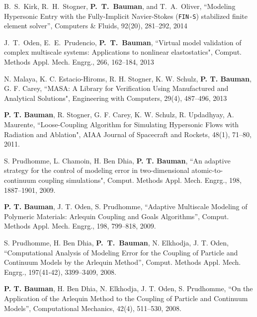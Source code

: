 %
B.~S.~Kirk, R.~H.~Stogner, \textbf{P.~T.~Bauman}, and T.~A.~Oliver,
``Modeling Hypersonic Entry with the Fully-Implicit Navier-Stokes (\texttt{FIN-S})
stabilized finite element solver'', Computers \& Fluids, 92(20), 281--292, 2014

\blankline

J.~T.~Oden, E.~E.~Prudencio, \textbf{P.~T.~Bauman},
``Virtual model validation of complex multiscale systems:
Applications to nonlinear elastostatics",
Comput. Methods Appl. Mech. Engrg., 266, 162--184, 2013

\blankline

N. Malaya, K. C. Estacio-Hiroms, R. H. Stogner, K. W. Schulz, \textbf{P. T. Bauman},
G. F. Carey,
``MASA: A Library for Verification Using Manufactured and Analytical Solutions",
Engineering with Computers, 29(4), 487--496, 2013

\blankline

\textbf{P. T. Bauman}, R. Stogner, G. F. Carey, K. W. Schulz, R. Updadhyay, A. Maurente, ``Loose-Coupling Algorithm for Simulating 
Hypersonic Flows with Radiation and Ablation", AIAA Journal of Spacecraft and Rockets, 48(1), 71--80, 2011.

\blankline

S. Prudhomme, L. Chamoin, H. Ben Dhia, \textbf{P. T. Bauman}, ``An adaptive strategy for the control of modeling error in two-dimensional atomic-to-continuum coupling simulations", Comput. Methods Appl. Mech. Engrg., 198, 1887--1901, 2009.

\blankline

\textbf{P. T. Bauman}, J. T. Oden, S. Prudhomme, ``Adaptive Multiscale Modeling of Polymeric Materials: Arlequin Coupling and Goals Algorithms'', Comput. Methods Appl. Mech. Engrg., 198, 799--818, 2009.
 
\blankline

S. Prudhomme, H. Ben Dhia, \textbf{P.~T.~Bauman}, N. Elkhodja, J. T. Oden, ``Computational Analysis of Modeling Error for the Coupling of Particle and Continuum Models by the Arlequin Method'', Comput. Methods Appl. Mech. Engrg., 197(41-42), 3399--3409, 2008.

\blankline

\textbf{P. T. Bauman}, H. Ben Dhia, N. Elkhodja, J. T. Oden, S. Prudhomme, ``On the Application of the Arlequin Method to the Coupling of Particle and Continuum Models'', Computational Mechanics, 42(4), 511--530, 2008.


